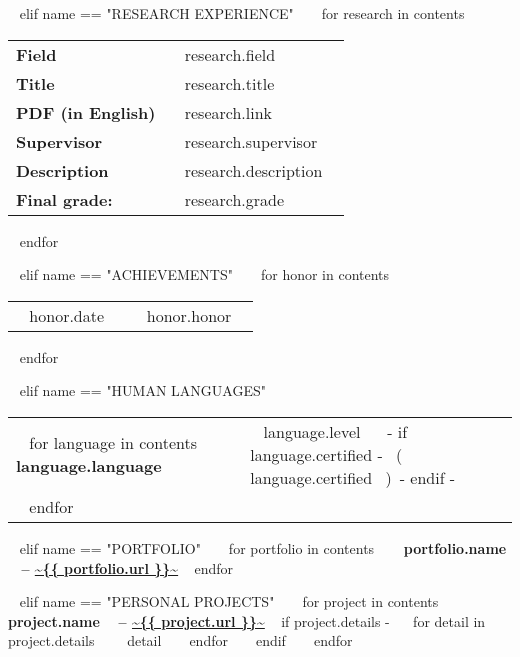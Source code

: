 \begin{minipage}{\textwidth}
~{ elif name == "RESEARCH EXPERIENCE" }~
  ~{ for research in contents }~
    \begin{tabular}{ @{} p{32mm} p{135mm} @{} }

    \small \bf Field & \small ~{{ research.field }}~ \\
    \small \bf Title & \small ~{{ research.title }}~ \\
    \small \bf PDF (in English) & \small ~{{ research.link }}~ \\
    \small \bf Supervisor & \small ~{{ research.supervisor }}~ \\
    \small \bf Description & \small ~{{ research.description }}~ \\
    \small \bf \small \color{maingrey} Final grade: & \small \color{maingrey} ~{{ research.grade }}~ \\
    
    \end{tabular}
    \vspace{1mm}
  ~{ endfor }~
  \vspace{4mm}

~{ elif name == "ACHIEVEMENTS" }~
  ~{ for honor in contents }~
    \begin{tabular}{ @{} p{32mm} p{135mm} @{} }
    {~{{ honor.date }}~} & {\small ~{{ honor.honor }}~}
    \end{tabular}
    \vspace{1mm}
  ~{ endfor }~

~{ elif name == "HUMAN LANGUAGES" }~
  \begin{tabular}{ @{} p{32mm} p{135mm} @{} }
  ~{ for language in contents }~
    \bf {~{{ language.language }}~} & {\small ~{{ language.level }}~ ~{- if language.certified -}~ \small\color{maingrey}\hspace{1mm}(~{{ language.certified }}~)~{- endif -}~} \\
  ~{ endfor }~
  \end{tabular}
  \vspace{2mm}

~{ elif name == "PORTFOLIO" }~
  ~{ for portfolio in contents }~
    {\bf ~{{ portfolio.name }}~ -- \color{maincolor}\url{~{{ portfolio.url }}~} }
    \vspace{1mm}
  ~{ endfor }~

~{ elif name == "PERSONAL PROJECTS" }~
  ~{ for project in contents }~
    {\small\bf ~{{ project.name }}~ -- \color{maincolor}\url{~{{ project.url }}~} }
    \vspace{1mm}
    ~{ if project.details -}~
    ~{ for detail in project.details }~
      $ $ \small ~{{ detail }}~
    ~{ endfor }~
    ~{ endif }~
    \vspace{3mm}
  ~{ endfor }~
  \vspace{15mm}


\end{minipage}
